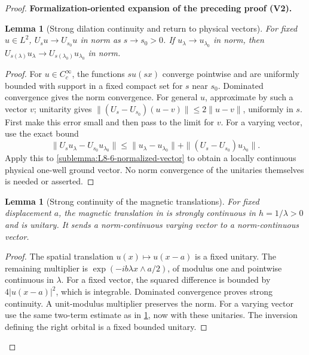 \documentclass[11pt]{article}
\newtheorem{lemma}[theorem]{Lemma}
\newcommand{\formalisationparentid}{X}
\newenvironment{formalisationaddition}[1]{\par\medskip\begingroup\color{blue}\def\formalisationparentid{#1}\setcounter{formalizationsublemma}{0}\let\lemma\formalizationsublemma\let\endlemma\endformalizationsublemma
  \def\Eo{\mathcal E_h^\circ}\def\EE{\mathcal E_h}\def\phio{\phi_h^\circ}\def\phih{\phi_h}\def\Ho{H_h^{\rm atom}(v^\circ)}\def\Ha{H_h^{\rm atom}}\def\HL{H_h^{L}}\def\Dh{D_h}\def\Log{\operatorname{Log}}\def\ellh{\ell_h}\def\Gp{G_{p,h}}\def\Ast{A_{*,h}}\def\ahat{\widehat{\mathfrak a}_h}\def\ah{\mathfrak a_h}\def\rh{\widehat\rho_h}\def\deltah{\widehat\delta_h}\def\oldref##1{\textup{(##1)}}\def\interface##1{\par\noindent\textit{Analytical interface used here.} ##1\par}\def\finish{\par\noindent\textit{Conclusion of the formalization-oriented expansion.} }\par\noindent\textbf{Formalization-oriented expansion of the preceding proof (V2).}\par\smallskip
}{\par\endgroup\medskip
}
\begin{document}
\begin{proof}
\begin{formalisationaddition}{L8.6}
\begin{lemma}[Strong dilation continuity and return to physical vectors]\label{sublemma:L8-6-strong-dilation}
For fixed $u\in L^2$, $U_su\to U_{s_0}u$ in norm as $s\to s_0>0$.
If $u_\lambda\to u_{\lambda_0}$ in norm, then
$U_{s(\lambda)}u_\lambda\to U_{s(\lambda_0)}u_{\lambda_0}$ in norm.
\end{lemma}
\begin{proof}
For $u\in C_c^\infty$, the functions $su(sx)$ converge pointwise and
are uniformly bounded with support in a fixed compact set for $s$
near $s_0$. Dominated convergence gives the norm convergence.
For general $u$, approximate by such a vector $v$; unitarity gives
$\|(U_s-U_{s_0})(u-v)\|\le2\|u-v\|$, uniformly in $s$.
First make this error small and then pass to the limit for $v$.
For a varying vector, use the exact bound
\[
 \|U_su_\lambda-U_{s_0}u_{\lambda_0}\|
 \le\|u_\lambda-u_{\lambda_0}\|
       +\|(U_s-U_{s_0})u_{\lambda_0}\|.
\]
Apply this to \ref{sublemma:L8-6-normalized-vector} to obtain a locally
continuous physical one-well ground vector. No norm convergence of the
unitaries themselves is needed or asserted.
\end{proof}

\begin{lemma}[Strong continuity of the magnetic translations]\label{sublemma:L8-6-magnetic-translation}
For fixed displacement $a$, the magnetic translation in
 is strongly continuous in $h=1/\lambda>0$
and is unitary. It sends a norm-continuous varying vector to a
norm-continuous vector.
\end{lemma}
\begin{proof}
The spatial translation $u(x)\mapsto u(x-a)$ is a fixed unitary.
The remaining multiplier is
$\exp(-ib\lambda x\wedge a/2)$, of modulus one and pointwise
continuous in $\lambda$. For a fixed vector, the squared difference
is bounded by $4|u(x-a)|^2$, which is integrable. Dominated convergence
proves strong continuity. A unit-modulus multiplier preserves the norm.
For a varying vector use the same two-term estimate as in
\ref{sublemma:L8-6-strong-dilation}, now with these unitaries.
The inversion defining the right orbital is a fixed bounded unitary.
\end{proof}


\end{formalisationaddition}
\end{proof}
\end{document}
